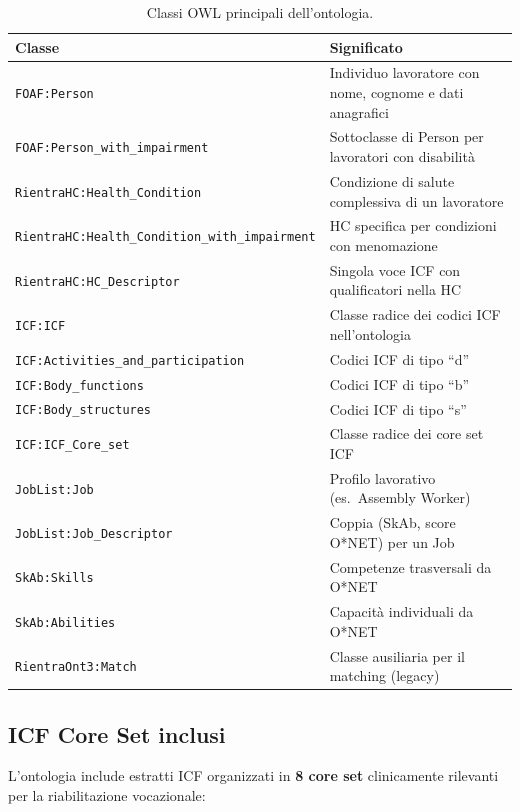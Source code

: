 \documentclass[a4paper,12pt]{article}
\begin{document}
\begin{table}[H]
\centering
\caption{Classi OWL principali dell'ontologia.}
\begin{tabular}{L{5.5cm} L{7cm}}
\toprule
\textbf{Classe} & \textbf{Significato} \\
\midrule
\texttt{FOAF:Person} & Individuo lavoratore con nome, cognome e dati anagrafici \\
{\footnotesize\texttt{FOAF:Person\_with\_impairment}} & Sottoclasse di Person per lavoratori con disabilit\`{a} \\
\texttt{RientraHC:Health\_Condition} & Condizione di salute complessiva di un lavoratore \\
\texttt{RientraHC:Health\_\allowbreak{}Condition\_\allowbreak{}with\_\allowbreak{}impairment} & HC specifica per condizioni con menomazione \\
\texttt{RientraHC:HC\_Descriptor} & Singola voce ICF con qualificatori nella HC \\
\texttt{ICF:ICF} & Classe radice dei codici ICF nell'ontologia \\
\texttt{ICF:Activities\_\allowbreak{}and\_\allowbreak{}participation} & Codici ICF di tipo ``d'' \\
\texttt{ICF:Body\_functions} & Codici ICF di tipo ``b'' \\
\texttt{ICF:Body\_structures} & Codici ICF di tipo ``s'' \\
\texttt{ICF:ICF\_Core\_set} & Classe radice dei core set ICF \\
\texttt{JobList:Job} & Profilo lavorativo (es.\ Assembly Worker) \\
\texttt{JobList:Job\_Descriptor} & Coppia (SkAb, score O*NET) per un Job \\
\texttt{SkAb:Skills} & Competenze trasversali da O*NET \\
\texttt{SkAb:Abilities} & Capacit\`{a} individuali da O*NET \\
\texttt{RientraOnt3:Match} & Classe ausiliaria per il matching (legacy) \\
\bottomrule
\end{tabular}
\end{table}

\subsection{ICF Core Set inclusi}

L'ontologia include estratti ICF organizzati in \textbf{8 core set}
clinicamente rilevanti per la riabilitazione vocazionale:
\end{document}
